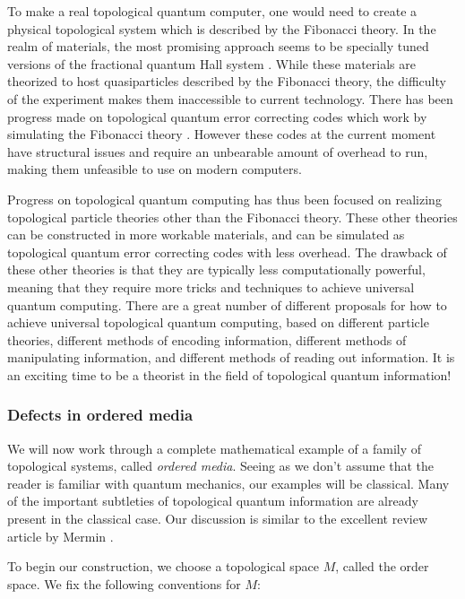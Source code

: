 To make a real topological quantum computer, one would need to create a physical topological system which is described by the Fibonacci theory. In the realm of materials, the most promising approach seems to be specially tuned versions of the fractional quantum Hall system \cite{zhu2015fractional}. While these materials are theorized to host quasiparticles described by the Fibonacci theory, the difficulty of the experiment makes them inaccessible to current technology. There has been progress made on topological quantum error correcting codes which work by simulating the Fibonacci theory \cite{schotte2022quantum, schotte2022fault, xu2024non}. However these codes at the current moment have structural issues and require an unbearable amount of overhead to run, making them unfeasible to use on modern computers.

Progress on topological quantum computing has thus been focused on realizing topological particle theories other than the Fibonacci theory. These other theories can be constructed in more workable materials, and can be simulated as topological quantum error correcting codes with less overhead. The drawback of these other theories is that they are typically less computationally powerful, meaning that they require more tricks and techniques to achieve universal quantum computing. There are a great number of different proposals for how to achieve universal topological quantum computing, based on different particle theories, different methods of encoding information, different methods of manipulating information, and different methods of reading out information. It is an exciting time to be a theorist in the field of topological quantum information!

\subsubsection{Defects in ordered media}

We will now work through a complete mathematical example of a family of topological systems, called {\em ordered media}. Seeing as we don't assume that the reader is familiar with quantum mechanics, our examples will be classical. Many of the important subtleties of topological quantum information are already present in the classical case. Our discussion is similar to the excellent review article by Mermin \cite{mermin1979topological}.

To begin our construction, we choose a topological space $M$, called the order space. We fix the following conventions for $M$:

